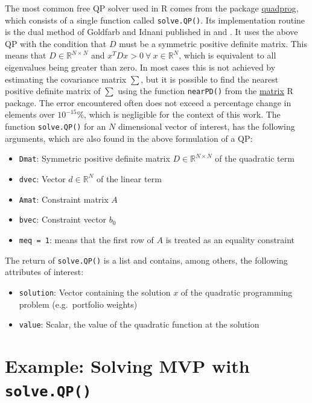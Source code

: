 \documentclass[
  oneside]{book}
\providecommand{\tightlist}{%
  \setlength{\itemsep}{0pt}\setlength{\parskip}{0pt}}
\begin{document}
The most common free QP solver used in R comes from the package \href{https://cran.r-project.org/web/packages/quadprog/quadprog.pdf}{quadprog}, which consists of a single function called \texttt{solve.QP()}. Its implementation routine is the dual method of Goldfarb and Idnani published in \citep{GoId1982} and \citep{GoId1983}. It uses the above QP with the condition that \(D\) must be a symmetric positive definite matrix. This means that \(D\in \mathbb{R}^{N \times N}\) and \(x^T D x > 0 \ \forall \ x \in \mathbb{R}^N\), which is equivalent to all eigenvalues being greater than zero. In most cases this is not achieved by estimating the covariance matrix \(\sum\), but it is possible to find the nearest positive definite matrix of \(\textstyle\sum\) using the function \texttt{nearPD()} from the \href{https://cran.r-project.org/web/packages/Matrix/Matrix.pdf}{matrix} R package. The error encountered often does not exceed a percentage change in elements over \(10^{-15} \%\), which is negligible for the context of this work. The function \texttt{solve.QP()} for an \(N\) dimensional vector of interest, has the following arguments, which are also found in the above formulation of a QP:

\begin{itemize}
\tightlist
\item
  \texttt{Dmat}: Symmetric positive definite matrix \(D \in \mathbb{R}^{N \times N}\) of the quadratic term
\item
  \texttt{dvec}: Vector \(d \in \mathbb{R}^{N}\) of the linear term
\item
  \texttt{Amat}: Constraint matrix \(A\)
\item
  \texttt{bvec}: Constraint vector \(b_0\)
\item
  \texttt{meq\ =\ 1}: means that the first row of \(A\) is treated as an equality constraint
\end{itemize}

The return of \texttt{solve.QP()} is a list and contains, among others, the following attributes of interest:

\begin{itemize}
\tightlist
\item
  \texttt{solution}: Vector containing the solution \(x\) of the quadratic programming problem (e.g.~portfolio weights)
\item
  \texttt{value}: Scalar, the value of the quadratic function at the solution
\end{itemize}

\hypertarget{exampleanalyticalmvp}{%
\section{\texorpdfstring{Example: Solving MVP with \texttt{solve.QP()}}{Example: Solving MVP with solve.QP()}}\label{exampleanalyticalmvp}}
\end{document}

